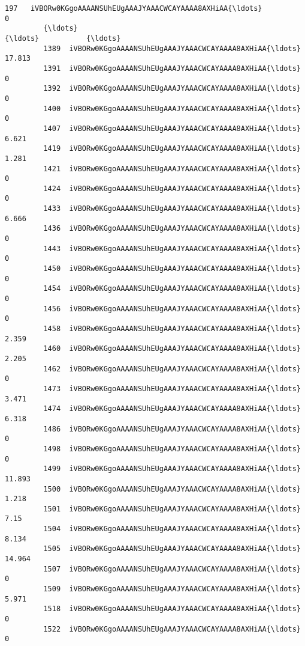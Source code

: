 \documentclass[11pt]{article}
\begin{document}
\begin{Verbatim}[commandchars=\\\{\}]
         197   iVBORw0KGgoAAAANSUhEUgAAAJYAAACWCAYAAAA8AXHiAA{\ldots}             0   
         {\ldots}                                                 {\ldots}           {\ldots}   
         1389  iVBORw0KGgoAAAANSUhEUgAAAJYAAACWCAYAAAA8AXHiAA{\ldots}        17.813   
         1391  iVBORw0KGgoAAAANSUhEUgAAAJYAAACWCAYAAAA8AXHiAA{\ldots}             0   
         1392  iVBORw0KGgoAAAANSUhEUgAAAJYAAACWCAYAAAA8AXHiAA{\ldots}             0   
         1400  iVBORw0KGgoAAAANSUhEUgAAAJYAAACWCAYAAAA8AXHiAA{\ldots}             0   
         1407  iVBORw0KGgoAAAANSUhEUgAAAJYAAACWCAYAAAA8AXHiAA{\ldots}         6.621   
         1419  iVBORw0KGgoAAAANSUhEUgAAAJYAAACWCAYAAAA8AXHiAA{\ldots}         1.281   
         1421  iVBORw0KGgoAAAANSUhEUgAAAJYAAACWCAYAAAA8AXHiAA{\ldots}             0   
         1424  iVBORw0KGgoAAAANSUhEUgAAAJYAAACWCAYAAAA8AXHiAA{\ldots}             0   
         1433  iVBORw0KGgoAAAANSUhEUgAAAJYAAACWCAYAAAA8AXHiAA{\ldots}         6.666   
         1436  iVBORw0KGgoAAAANSUhEUgAAAJYAAACWCAYAAAA8AXHiAA{\ldots}             0   
         1443  iVBORw0KGgoAAAANSUhEUgAAAJYAAACWCAYAAAA8AXHiAA{\ldots}             0   
         1450  iVBORw0KGgoAAAANSUhEUgAAAJYAAACWCAYAAAA8AXHiAA{\ldots}             0   
         1454  iVBORw0KGgoAAAANSUhEUgAAAJYAAACWCAYAAAA8AXHiAA{\ldots}             0   
         1456  iVBORw0KGgoAAAANSUhEUgAAAJYAAACWCAYAAAA8AXHiAA{\ldots}             0   
         1458  iVBORw0KGgoAAAANSUhEUgAAAJYAAACWCAYAAAA8AXHiAA{\ldots}         2.359   
         1460  iVBORw0KGgoAAAANSUhEUgAAAJYAAACWCAYAAAA8AXHiAA{\ldots}         2.205   
         1462  iVBORw0KGgoAAAANSUhEUgAAAJYAAACWCAYAAAA8AXHiAA{\ldots}             0   
         1473  iVBORw0KGgoAAAANSUhEUgAAAJYAAACWCAYAAAA8AXHiAA{\ldots}         3.471   
         1474  iVBORw0KGgoAAAANSUhEUgAAAJYAAACWCAYAAAA8AXHiAA{\ldots}         6.318   
         1486  iVBORw0KGgoAAAANSUhEUgAAAJYAAACWCAYAAAA8AXHiAA{\ldots}             0   
         1498  iVBORw0KGgoAAAANSUhEUgAAAJYAAACWCAYAAAA8AXHiAA{\ldots}             0   
         1499  iVBORw0KGgoAAAANSUhEUgAAAJYAAACWCAYAAAA8AXHiAA{\ldots}        11.893   
         1500  iVBORw0KGgoAAAANSUhEUgAAAJYAAACWCAYAAAA8AXHiAA{\ldots}         1.218   
         1501  iVBORw0KGgoAAAANSUhEUgAAAJYAAACWCAYAAAA8AXHiAA{\ldots}          7.15   
         1504  iVBORw0KGgoAAAANSUhEUgAAAJYAAACWCAYAAAA8AXHiAA{\ldots}         8.134   
         1505  iVBORw0KGgoAAAANSUhEUgAAAJYAAACWCAYAAAA8AXHiAA{\ldots}        14.964   
         1507  iVBORw0KGgoAAAANSUhEUgAAAJYAAACWCAYAAAA8AXHiAA{\ldots}             0   
         1509  iVBORw0KGgoAAAANSUhEUgAAAJYAAACWCAYAAAA8AXHiAA{\ldots}         5.971   
         1518  iVBORw0KGgoAAAANSUhEUgAAAJYAAACWCAYAAAA8AXHiAA{\ldots}             0   
         1522  iVBORw0KGgoAAAANSUhEUgAAAJYAAACWCAYAAAA8AXHiAA{\ldots}             0   
         

\end{Verbatim}
\end{document}
